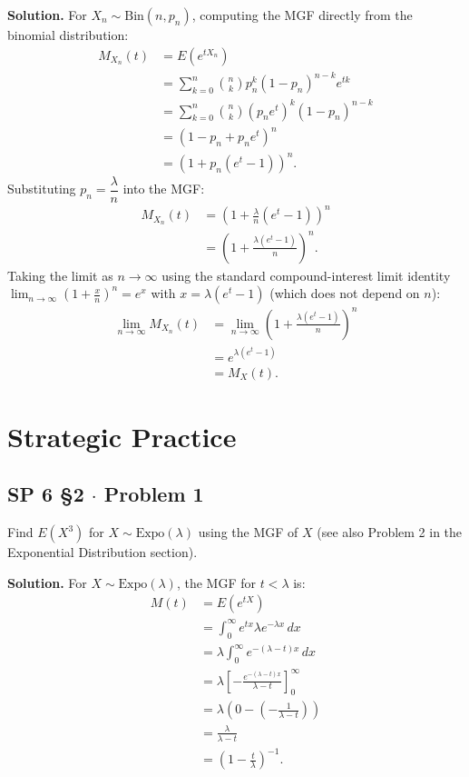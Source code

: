 \documentclass[11pt,a4paper]{article}
\begin{document}
\noindent \textbf{Solution.} For $X_n \sim \text{Bin}(n, p_n)$, computing the MGF directly from the binomial distribution:
\begin{align*}
M_{X_n}(t) &= E\left( e^{t X_n} \right) \\
&= \sum_{k=0}^{n} \binom{n}{k} p_n^k (1 - p_n)^{n-k} e^{tk} \\
&= \sum_{k=0}^{n} \binom{n}{k} \left( p_n e^t \right)^k (1 - p_n)^{n-k} \\
&= (1 - p_n + p_n e^t)^n \\
&= \left( 1 + p_n(e^t - 1) \right)^n.
\end{align*}
Substituting $p_n = \dfrac{\lambda}{n}$ into the MGF:
\begin{align*}
M_{X_n}(t) &= \left( 1 + \frac{\lambda}{n}(e^t - 1) \right)^n \\
&= \left( 1 + \frac{\lambda(e^t - 1)}{n} \right)^n.
\end{align*}
Taking the limit as $n \to \infty$ using the standard compound-interest limit identity $\lim_{n \to \infty} \left( 1 + \frac{x}{n} \right)^n = e^x$ with $x = \lambda(e^t - 1)$ (which does not depend on $n$):
\begin{align*}
\lim_{n \to \infty} M_{X_n}(t) &= \lim_{n \to \infty} \left( 1 + \frac{\lambda(e^t - 1)}{n} \right)^n \\
&= e^{\lambda(e^t - 1)} \\
&= M_X(t).
\end{align*}

\vspace{15pt}
\section{Strategic Practice}

\subsection{SP 6 \S2 $\cdot$ Problem 1}
\begin{tcolorbox}[title={SP 6 \S2 $\cdot$ Problem 1}]
Find $E(X^3)$ for $X \sim \text{Expo}(\lambda)$ using the MGF of $X$ (see also Problem 2 in the Exponential Distribution section).
\end{tcolorbox}

\noindent \textbf{Solution.} For $X \sim \text{Expo}(\lambda)$, the MGF for $t < \lambda$ is:
\begin{align*}
M(t) &= E\left( e^{tX} \right) \\
&= \int_{0}^{\infty} e^{tx} \lambda e^{-\lambda x} \, dx \\
&= \lambda \int_{0}^{\infty} e^{-(\lambda - t)x} \, dx \\
&= \lambda \left[ -\frac{e^{-(\lambda - t)x}}{\lambda - t} \right]_{0}^{\infty} \\
&= \lambda \left( 0 - \left(-\frac{1}{\lambda - t}\right) \right) \\
&= \frac{\lambda}{\lambda - t} \\
&= \left( 1 - \frac{t}{\lambda} \right)^{-1}.
\end{align*}
\end{document}
